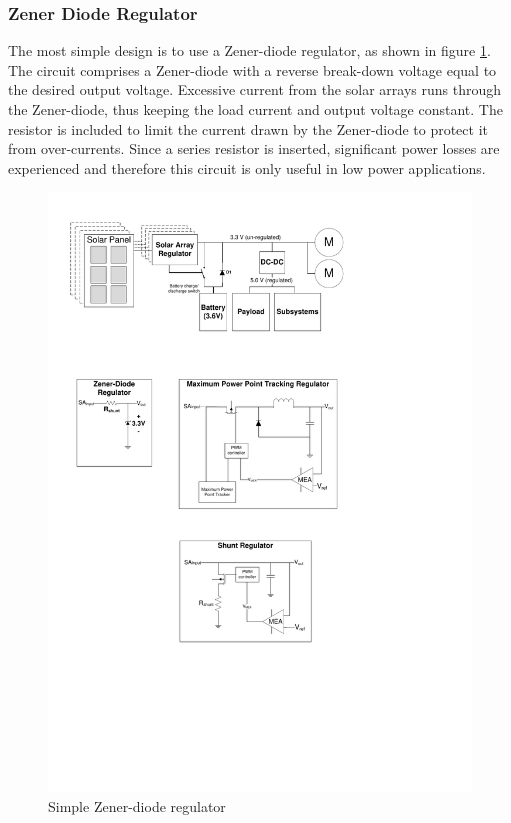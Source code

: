 \subsubsection*{Zener Diode Regulator}
The most simple design is to use a Zener-diode regulator, as shown in figure \ref{fig:zenerdiode_regulator}. The circuit comprises a Zener-diode with a reverse break-down voltage equal to the desired output voltage. Excessive current from the solar arrays runs through the Zener-diode, thus keeping the load current and output voltage constant. The resistor is included to limit the current drawn by the Zener-diode to protect it from over-currents. Since a series resistor is inserted, significant  power losses are experienced and therefore this circuit is only useful in low power applications. 
%
\begin{figure}[H]
\centering
\includegraphics[scale=1]{figures/fig_PDR_Zenerdiode_Regualtor}
\caption{Simple Zener-diode regulator}
\label{fig:zenerdiode_regulator}
\end{figure}
%
%
